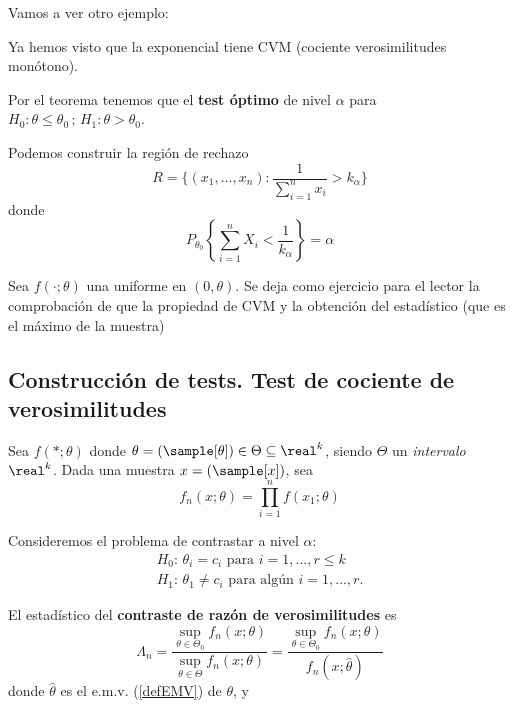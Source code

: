 \documentclass{apuntes}
\begin{document}
Vamos a ver otro ejemplo:

\begin{example}
Ya hemos visto que la exponencial tiene CVM (cociente verosimilitudes monótono).

Por el teorema tenemos que el \textbf{test óptimo} de nivel $\alpha$ para $H_0: \theta \leq \theta_0\,;\, H_1: \theta > \theta_0$.

Podemos construir la región de rechazo
\[R = \{(x_1,\dotsc,x_n): \frac{1}{\sum_{i=1}^n x_i} > k_{\alpha}\}\] donde \[P_{\theta_0} \left\{\sum_{i=1}^n X_i < \frac{1}{k_{\alpha}}\right\} = \alpha\]
\end{example}

\begin{example}
Sea $f(\cdot;\theta)$ una uniforme en $(0,\theta)$.
Se deja como ejercicio para el lector la comprobación de que la propiedad de CVM y la obtención del estadístico (que es el máximo de la muestra)
\end{example}

\subsection{Construcción de tests. Test de cociente de verosimilitudes}

\begin{defn}

Sea $f(\ast;\theta)$ donde $\theta =(\sample[\theta])\in\Theta\subseteq\real^k$, siendo $\Theta$ un \textit{intervalo} $\real^k$. Dada una muestra $x=(\sample[x])$, sea \[ f_n(x;\theta) =\prod_{i=1}^{n} f(x_1;\theta) \]

Consideremos el problema de contrastar a nivel $\alpha$:
\begin{gather*}
H_0: \,\theta_i = c_i \text{ para } i = 1,\dotsc, r \leq k\\
H_1: \, \theta_1 \neq c_i \text{ para algún } i = 1,\dotsc, r.
\end{gather*}

El estadístico del \textbf{contraste de razón de verosimilitudes} es
\[
\Lambda_n =
\frac{\sup_{\theta\in\Theta_0}f_n(x;\theta)}{\sup_{\theta\in\Theta}f_n(x;\theta)} =
\frac{\sup_{\theta\in\Theta_0}f_n(x;\theta)}{f_n(x;\hat{\theta})}
\]
donde $\hat{\theta}$ es el e.m.v. (\ref{defEMV}) de $\theta$, y
\end{defn}
\end{document}
